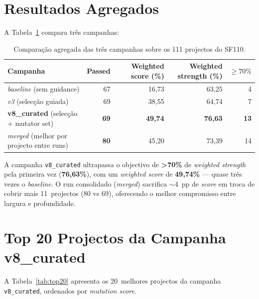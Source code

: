 \documentclass[12pt,a4paper]{article}
\begin{document}
\section{Resultados Agregados}

A Tabela~\ref{tab:agg} compara três campanhas:

\begin{table}[H]
  \centering
  \caption{Comparação agregada das três campanhas sobre os 111 projectos do SF110.}
  \label{tab:agg}
  \footnotesize
  \begin{tabular}{lrrrr}
    \toprule
    \textbf{Campanha} & \textbf{Passed} & \textbf{Weighted score (\%)} &
    \textbf{Weighted strength (\%)} & \textbf{$\geq 70\%$} \\
    \midrule
    \textit{baseline} (sem guidance)                  & 67 & 16,73 & 63,25 &  4 \\
    \textit{v3} (selecção guiada)                     & 69 & 38,55 & 64,74 &  7 \\
    \textbf{v8\_curated} (selecção + mutator set)    & \textbf{69} & \textbf{49,74} & \textbf{76,63} & \textbf{13} \\
    \midrule
    \textit{merged} (melhor por projecto entre runs)  & \textbf{80} & 45,20 & 73,39 & 14 \\
    \bottomrule
  \end{tabular}
\end{table}

\noindent
A campanha \texttt{v8\_curated} ultrapassa o objectivo de \textbf{>70\%} de
\textit{weighted strength} pela primeira vez (\textbf{76,63\%}), com um \textit{weighted
score} de \textbf{49,74\%} --- quase três vezes o \textit{baseline}. O run consolidado
(\textit{merged}) sacrifica $\sim$4~pp de \textit{score} em troca de cobrir mais
11~projectos (80 vs 69), oferecendo o melhor compromisso entre largura e profundidade.

\section{Top 20 Projectos da Campanha v8\_curated}

A Tabela~\ref{tab:top20} apresenta os 20~melhores projectos da campanha
\texttt{v8\_curated}, ordenados por \textit{mutation score}.
\end{document}
